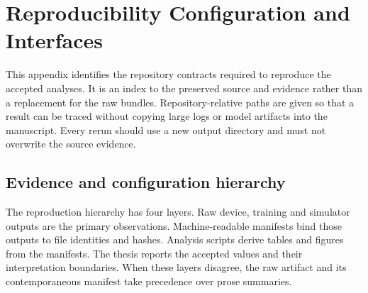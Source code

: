 \chapter{Reproducibility Configuration and Interfaces}
\label{app:reproducibility}

This appendix identifies the repository contracts required to reproduce the
accepted analyses. It is an index to the preserved source and evidence rather
than a replacement for the raw bundles. Repository-relative paths are given so
that a result can be traced without copying large logs or model artifacts into
the manuscript. Every rerun should use a new output directory and must not
overwrite the source evidence.

\section{Evidence and configuration hierarchy}

The reproduction hierarchy has four layers. Raw device, training and simulator
outputs are the primary observations. Machine-readable manifests bind those
outputs to file identities and hashes. Analysis scripts derive tables and
figures from the manifests. The thesis reports the accepted values and their
interpretation boundaries. When these layers disagree, the raw artifact and
its contemporaneous manifest take precedence over prose summaries.

